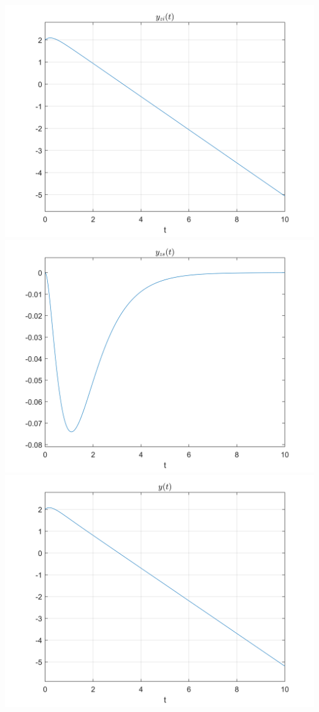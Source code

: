 \documentclass[UTF8,a4paper]{article}
\begin{document}
\includegraphics[scale=1]{符号法/2-zi.png}\\
\includegraphics[scale=1]{符号法/2-zs.png}\\
\includegraphics[scale=1]{符号法/2-all.png}
\end{document}
